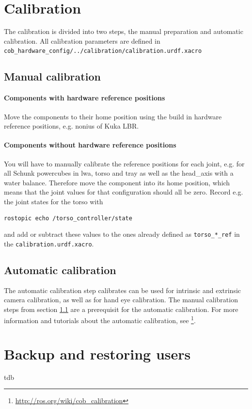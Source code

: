 \section{Calibration}
The calibration is divided into two steps, the manual preparation and automatic calibration. All calibration parameters are defined in \texttt{cob\_hardware\_config/../calibration/calibration.urdf.xacro}

\subsection{Manual calibration}\label{sec:manual_calibration}

\paragraph{Components with hardware reference positions}
Move the components to their home position using the build in hardware reference positions, e.g. nonius of Kuka LBR.

\paragraph{Components without hardware reference positions}
You will have to manually calibrate the reference positions for each joint, e.g. for all Schunk powercubes in lwa, torso and tray as well as the head\_axis with a water balance. Therefore move the component into its home position, which means that the joint values for that configuration should all be zero. Record e.g. the joint states for the torso with
\begin{lstlisting}
rostopic echo /torso_controller/state
\end{lstlisting}
and add or subtract these values to the ones already defined as \texttt{torso\_*\_ref} in the \texttt{calibration.urdf.xacro}.

\subsection{Automatic calibration}
The automatic calibration step calibrates can be used for intrinsic and extrinsic camera calibration, as well as for hand eye calibration. The manual calibration steps from section \ref{sec:manual_calibration} are a prerequisit for the automatic calibration. For more information and tutorials about the automatic calibration, see \footnote{\url{http://ros.org/wiki/cob_calibration}}.

\section{Backup and restoring users}   
tdb


